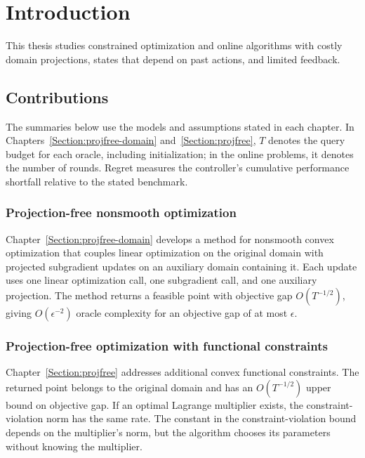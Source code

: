 \chapter{Introduction}
\label{Section:Introduction}

This thesis studies constrained optimization and online algorithms with
costly domain projections, states that depend on past actions, and limited
feedback.

\section{Contributions}

The summaries below use the models and assumptions stated in each chapter.
In Chapters~\ref{Section:projfree-domain} and~\ref{Section:projfree}, $T$
denotes the query budget for each oracle, including initialization; in the
online problems, it denotes the number of rounds.
Regret measures the controller's cumulative performance shortfall relative
to the stated benchmark.

\subsection{Projection-free nonsmooth optimization}

Chapter~\ref{Section:projfree-domain} develops a method for nonsmooth convex
optimization that couples linear optimization on the original domain with
projected subgradient updates on an auxiliary domain containing it.
Each update uses one linear optimization call, one subgradient call, and
one auxiliary projection. The method returns a feasible point with
objective gap $O(T^{-1/2})$, giving $O(\epsilon^{-2})$ oracle complexity
for an objective gap of at most $\epsilon$.

\subsection{Projection-free optimization with functional constraints}

Chapter~\ref{Section:projfree} addresses additional convex functional
constraints. The returned point belongs to the original domain and has an
$O(T^{-1/2})$ upper bound on objective gap. If an optimal Lagrange multiplier
exists, the constraint-violation norm has the same rate. The constant in the
constraint-violation bound depends on the multiplier's norm, but the algorithm
chooses its parameters without knowing the multiplier.

